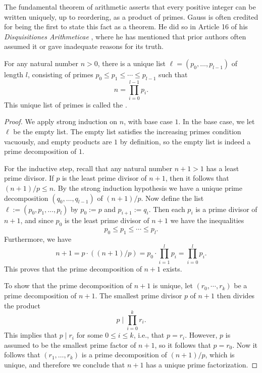 The fundamental theorem of arithmetic asserts that every positive integer can be written uniquely, up to reordering, as a product of primes. Gauss is often credited for being the first to state this fact as a theorem. He did so in Article 16 of his \emph{Disquisitiones Arithmeticae} \cite{gauss1986}, where he has mentioned that prior authors often assumed it or gave inadequate reasons for its truth.

\begin{theorem}\label{theorem:fundamental-theorem-of-arithmetic}
  For any natural number $n>0$, there is a unique list $\ell=(p_0,\ldots,p_{l-1})$ of length $l$, consisting of primes $p_0\leq p_1\leq \cdots \leq p_{l-1}$ such that
  \begin{equation*}
    n=\prod_{i=0}^{l-1}p_i.
  \end{equation*}
  This unique list of primes is called the .
\end{theorem}

\begin{proof}
  We apply strong induction on $n$, with base case $1$. In the base case, we let $\ell$ be the empty list. The empty list satisfies the increasing primes condition vacuously, and empty products are $1$ by definition, so the empty list is indeed a prime decomposition of $1$.

  For the inductive step, recall that any natural number $n+1>1$ has a least prime divisor. If $p$ is the least prime divisor of $n+1$, then it follows that $(n+1)/p\leq n$. By the strong induction hypothesis we have a unique prime decomposition $(q_0,\ldots,q_{l-1})$ of $(n+1)/p$. Now define the list $\ell:=(p_0,p_1,\ldots,p_l)$ by $p_0:=p$ and $p_{i+1}:=q_i$. Then each $p_i$ is a prime divisor of $n+1$, and since $p_0$ is the least prime divisor of $n+1$ we have the inequalities
  \begin{equation*}
    p_0\leq p_1 \leq \cdots \leq p_l.
  \end{equation*}
  Furthermore, we have
  \begin{equation*}
    n+1 = p\cdot ((n+1)/p) = p_0 \cdot \prod_{i=1}^l p_i = \prod_{i=0}^l p_i.
  \end{equation*}
  This proves that the prime decomposition of $n+1$ exists.

  To show that the prime decomposition of $n+1$ is unique, let $(r_0,\cdots,r_k)$ be a prime decomposition of $n+1$. The smallest prime divisor $p$ of $n+1$ then divides the product
  \begin{equation*}
    p \mid \prod_{i=0}^k r_i.
  \end{equation*}
  This implies that $p\mid r_i$ for some $0\leq i \leq k$, i.e., that $p=r_i$. However, $p$ is assumed to be the smallest prime factor of $n+1$, so it follows that $p=r_0$. Now it follows that $(r_1,\ldots,r_k)$ is a prime decomposition of $(n+1)/p$, which is unique, and therefore we conclude that $n+1$ has a unique prime factorization.
\end{proof}

